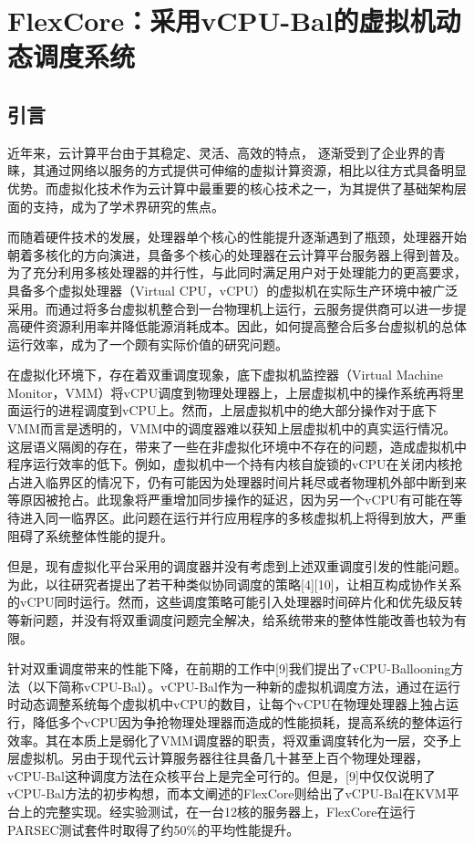 
\chapter{FlexCore：采用vCPU-Bal的虚拟机动态调度系统}
\label{chap:flexcore}



\section{引言}

近年来，云计算平台由于其稳定、灵活、高效的特点， 逐渐受到了企业界的青睐，其通过网络以服务的方式提供可伸缩的虚拟计算资源，相比以往方式具备明显优势。而虚拟化技术作为云计算中最重要的核心技术之一，为其提供了基础架构层面的支持，成为了学术界研究的焦点。

而随着硬件技术的发展，处理器单个核心的性能提升逐渐遇到了瓶颈，处理器开始朝着多核化的方向演进，具备多个核心的处理器在云计算平台服务器上得到普及。为了充分利用多核处理器的并行性，与此同时满足用户对于处理能力的更高要求，具备多个虚拟处理器（Virtual CPU，vCPU）的虚拟机在实际生产环境中被广泛采用。而通过将多台虚拟机整合到一台物理机上运行，云服务提供商可以进一步提高硬件资源利用率并降低能源消耗成本。因此，如何提高整合后多台虚拟机的总体运行效率，成为了一个颇有实际价值的研究问题。

在虚拟化环境下，存在着双重调度现象\cite{JohnD}，底下虚拟机监控器（Virtual Machine Monitor，VMM）将vCPU调度到物理处理器上，上层虚拟机中的操作系统再将里面运行的进程调度到vCPU上。然而，上层虚拟机中的绝大部分操作对于底下VMM而言是透明的，VMM中的调度器难以获知上层虚拟机中的真实运行情况。这层语义隔阂的存在，带来了一些在非虚拟化环境中不存在的问题，造成虚拟机中程序运行效率的低下。例如，虚拟机中一个持有内核自旋锁的vCPU在关闭内核抢占进入临界区的情况下，仍有可能因为处理器时间片耗尽或者物理机外部中断到来等原因被抢占。此现象将严重增加同步操作的延迟，因为另一个vCPU有可能在等待进入同一临界区。此问题在运行并行应用程序的多核虚拟机上将得到放大，严重阻碍了系统整体性能的提升。

但是，现有虚拟化平台采用的调度器并没有考虑到上述双重调度引发的性能问题。为此，以往研究者提出了若干种类似协同调度的策略[4][10]，让相互构成协作关系的vCPU同时运行。然而，这些调度策略可能引入处理器时间碎片化和优先级反转等新问题，并没有将双重调度问题完全解决，给系统带来的整体性能改善也较为有限。

针对双重调度带来的性能下降，在前期的工作中[9]我们提出了vCPU-Ballooning方法（以下简称vCPU-Bal）。vCPU-Bal作为一种新的虚拟机调度方法，通过在运行时动态调整系统每个虚拟机中vCPU的数目，让每个vCPU在物理处理器上独占运行，降低多个vCPU因为争抢物理处理器而造成的性能损耗，提高系统的整体运行效率。其在本质上是弱化了VMM调度器的职责，将双重调度转化为一层，交予上层虚拟机。另由于现代云计算服务器往往具备几十甚至上百个物理处理器，vCPU-Bal这种调度方法在众核平台上是完全可行的。但是，[9]中仅仅说明了vCPU-Bal方法的初步构想，而本文阐述的FlexCore则给出了vCPU-Bal在KVM平台上的完整实现。经实验测试，在一台12核的服务器上，FlexCore在运行PARSEC测试套件时取得了约50\%的平均性能提升。

